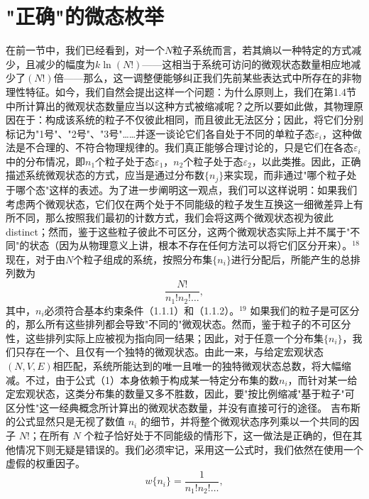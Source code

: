 \section{"正确"的微态枚举}\label{ux6b63ux786eux7684ux5faeux6001ux679aux4e3e}
在前一节中，我们已经看到，对一个\(N\)粒子系统而言，若其熵以一种特定的方式减少，且减少的幅度为\(k\ln(N!)\)——这相当于系统可访问的微观状态数量相应地减少了\((N!)\)倍——那么，这一调整便能够纠正我们先前某些表达式中所存在的非物理性特征。如今，我们自然会提出这样一个问题：为什么原则上，我们在第1.4节中所计算出的微观状态数量应当以这种方式被缩减呢？之所以要如此做，其物理原因在于：构成该系统的粒子不仅彼此相同，而且彼此无法区分；因此，将它们分别标记为"1号"、"2号"、"3号"\ldots\ldots 并逐一谈论它们各自处于不同的单粒子态\(\varepsilon_i\)，这种做法是不合理的、不符合物理规律的。我们真正能够合理讨论的，只是它们在各态\(\varepsilon_i\)中的分布情况，即\(n_1\)个粒子处于态\(\varepsilon_1\)，\(n_2\)个粒子处于态\(\varepsilon_2\)，以此类推。因此，正确描述系统微观状态的方式，应当是通过分布数\(\{n_j\}\)来实现，而非通过"哪个粒子处于哪个态"这样的表述。为了进一步阐明这一观点，我们可以这样说明：如果我们考虑两个微观状态，它们仅在两个处于不同能级的粒子发生互换这一细微差异上有所不同，那么按照我们最初的计数方式，我们会将这两个微观状态视为彼此 distinct；然而，鉴于这些粒子彼此不可区分，这两个微观状态实际上并不属于"不同"的状态（因为从物理意义上讲，根本不存在任何方法可以将它们区分开来）。\(^{18}\)
现在，对于由\(N\)个粒子组成的系统，按照分布集\(\{n_i\}\)进行分配后，所能产生的总排列数为
\begin{equation}\tag{1.3.67}\label{eq:1.3.67}
\frac { N ! } { n _ { 1 } ! n _ { 2 } ! \ldots } ,
\end{equation}
其中，\(n_{i}\)必须符合基本约束条件（1.1.1）和（1.1.2）。\(^{19}\) 如果我们的粒子是可区分的，那么所有这些排列都会导致"不同的"微观状态。然而，鉴于粒子的不可区分性，这些排列实际上应被视为指向同一结果；因此，对于任意一个分布集\(\{n_{i}\}\)，我们只存在一个、且仅有一个独特的微观状态。由此一来，与给定宏观状态\((N,V,E)\)相匹配，系统所能达到的唯一且唯一的独特微观状态总数，将大幅缩减。不过，由于公式（1）本身依赖于构成某一特定分布集的数\(n_{i}\)，而针对某一给定宏观状态，这类分布集的数量又多不胜数，因此，要"按比例缩减"基于粒子"可区分性"这一经典概念所计算出的微观状态数量，并没有直接可行的途径。
吉布斯的公式显然只是无视了数值 \(n_{i}\) 的细节，并将整个微观状态序列乘以一个共同的因子 \(N!\)；在所有 \(N\) 个粒子恰好处于不同能级的情形下，这一做法是正确的，但在其他情况下则无疑是错误的。我们必须牢记，采用这一公式时，我们依然在使用一个虚假的权重因子。
\begin{equation}\tag{1.3.68}\label{eq:1.3.68}
w \{ n _ { i } \} = \frac { 1 } { n _ { 1 } ! n _ { 2 } ! \ldots } ,
\end{equation}
